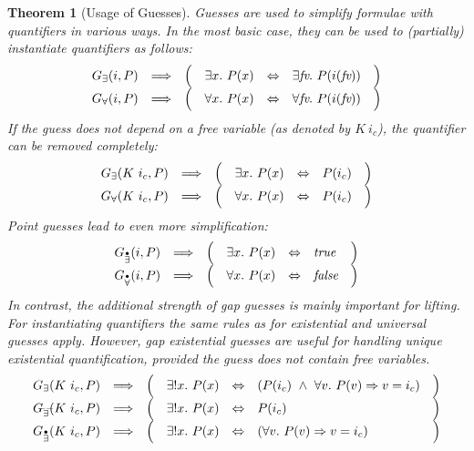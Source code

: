 \documentclass[a4paper,12pt,DIV=12,oneside]{scrbook}
\newcommand{\fv}{\textit{fv}}
\newtheorem{theorem}[lemma]{Theorem}
\theoremstyle{definition}
\theoremstyle{remark}
\newcommand{\GE}{\ensuremath{G_\exists}}
\newcommand{\GEP}{\ensuremath{G_{\accentset{\bullet}{\exists}}}}
\newcommand{\GEG}{\ensuremath{G_{\accentset{\_\,\_}{\exists}}}}
\newcommand{\GU}{\ensuremath{G_\forall}}
\newcommand{\GUP}{\ensuremath{G_{\accentset{\bullet}{\forall}}}}
\begin{document}
\begin{theorem}[Usage of Guesses]\label{lemma_guesses_usage}
Guesses are used to simplify formulae with quantifiers in various ways. In the most basic case, they can
be used to (partially) instantiate quantifiers as follows:
\[%
\begin{array}[t]{cccrclc}
  \GE(i, P) & \Longrightarrow & \Big( & \exists x.\ P(x) & \Leftrightarrow & \exists \fv.\ P(i(\fv)) & \Big) \\
  \GU(i, P) & \Longrightarrow & \Big( & \forall x.\ P(x) & \Leftrightarrow & \forall \fv.\ P(i(\fv)) & \Big) \\
\end{array}
\]
%
If the guess does not depend on a free variable (as denoted by $K\ i_c$), the quantifier can be removed completely:
\[
\begin{array}[t]{cccrclc}
  \GE(K\ i_c, P) & \Longrightarrow & \Big( & \exists x.\ P(x) & \Leftrightarrow & P(i_c) & \Big) \\
  \GU(K\ i_c, P) & \Longrightarrow & \Big( & \forall x.\ P(x) & \Leftrightarrow & P(i_c) & \Big) \\
\end{array}
\]
Point guesses lead to even more simplification:
\[
\begin{array}[t]{cccrclc}
  \GEP(i, P) & \Longrightarrow & \Big( & \exists x.\ P(x) & \Leftrightarrow & \textit{true} & \Big) \\
  \GUP(i, P) & \Longrightarrow & \Big( & \forall x.\ P(x) & \Leftrightarrow & \textit{false} & \Big) \\
\end{array}
\]
In contrast, the additional strength of gap guesses
is mainly important for lifting. For instantiating quantifiers the same rules as for
existential and universal guesses apply.
However, gap existential guesses are useful for handling unique existential quantification, provided
the guess does not contain free variables.
\[
\begin{array}[t]{cccrclc}
  \GE(K\ i_c, P) & \Longrightarrow & \Big( & \exists! x.\ P(x) & \Leftrightarrow &
    (P(i_c)\ \wedge\ \forall v.\ P(v) \Rightarrow v = i_c) & \Big) \\
  \GEG(K\ i_c, P) & \Longrightarrow & \Big( & \exists! x.\ P(x) & \Leftrightarrow &
    P(i_c) & \Big) \\
  \GEP(K\ i_c, P) & \Longrightarrow & \Big( & \exists! x.\ P(x) & \Leftrightarrow &
    (\forall v.\ P(v) \Rightarrow v = i_c) & \Big)
\end{array}
\]
\end{theorem}
\end{document}
